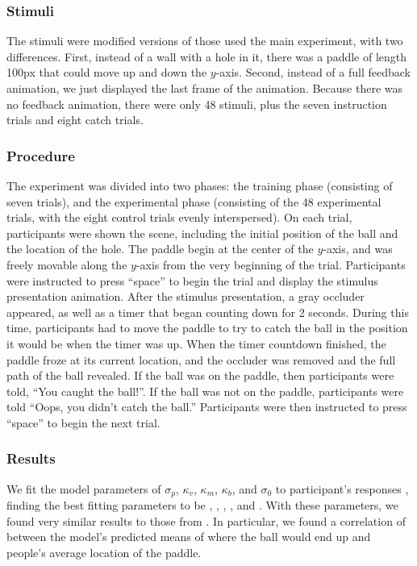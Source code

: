 \documentclass[10pt,letterpaper]{article}
\begin{document}
\subsubsection{Stimuli}

The stimuli were modified versions of those used the main experiment, with two differences.
First, instead of a wall with a hole in it, there was a paddle of length 100px that could move up and down the $y$-axis.
Second, instead of a full feedback animation, we just displayed the last frame of the animation.
Because there was no feedback animation, there were only 48 stimuli, plus the seven instruction trials and eight catch trials.

\subsubsection{Procedure}

The experiment was divided into two phases: the training phase (consisting of seven trials), and the experimental phase (consisting of the 48 experimental trials, with the eight control trials evenly interspersed).
On each trial, participants were shown the scene, including the initial position of the ball and the location of the hole.
The paddle begin at the center of the $y$-axis, and was freely movable along the $y$-axis from the very beginning of the trial.
Participants were instructed to press ``space'' to begin the trial and display the stimulus presentation animation.
After the stimulus presentation, a gray occluder appeared, as well as a timer that began counting down for 2 seconds.
During this time, participants had to move the paddle to try to catch the ball in the position it would be when the timer was up.
When the timer countdown finished, the paddle froze at its current location, and the occluder was removed and the full path of the ball revealed.
If the ball was on the paddle, then participants were told, ``You caught the ball!''.
If the ball was not on the paddle, participants were told ``Oops, you didn't catch the ball.''
Participants were then instructed to press ``space'' to begin the next trial.

\subsubsection{Results}

We fit the model parameters of $\sigma_p$, $\kappa_v$, $\kappa_m$, $\kappa_b$, and $\sigma_0$ to participant's responses \cite<for details, see>{Smith:2013fc}, finding the best fitting parameters to be \perr{}, \kapv{}, \kapm{}, \kapb{}, and \sdzero{}. 
With these parameters, we found very similar results to those from .
In particular, we found a correlation of \PaddleCorr{} between the model's predicted means of where the ball would end up and people's average location of the paddle.



\setlength{\bibleftmargin}{.125in}
\setlength{\bibindent}{-\bibleftmargin}


\end{document}
